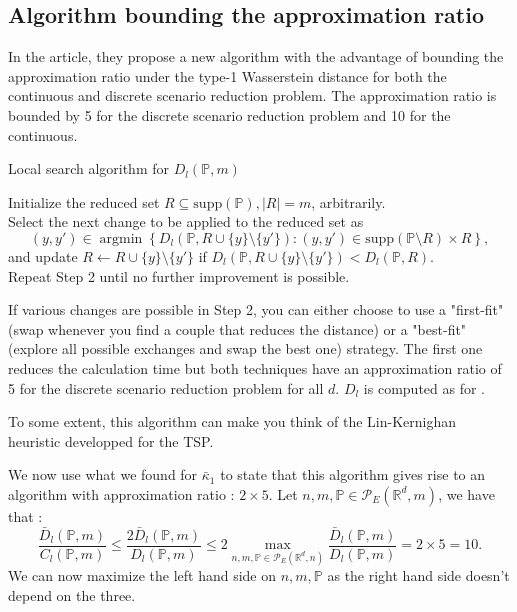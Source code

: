 \documentclass{amsart}
\newcommand{\argmin}{\mathop{\arg\min}}
\newcommand{\RR}{\mathbb{R}}
\begin{document}
\subsection{Algorithm bounding the approximation ratio}
In the article, they propose a new algorithm with the advantage of bounding the approximation ratio under the type-1 Wasserstein distance for both the continuous and discrete scenario reduction problem. The approximation ratio is bounded by 5 for the discrete scenario reduction problem and 10 for the continuous.
\begin{algorithm}
    \caption{Local search algorithm for $D_l\left(\mathbb{P},m\right)$}\label{Local search}
    Initialize the reduced set $R\subseteq \text{supp}\left(\mathbb{P}\right), \lvert R\rvert = m$, arbitrarily. \\ Select the next change to be applied to the reduced set as 
    $$
    \left(y,y'\right)\in\argmin\left\{D_l\left(\mathbb{P},R\cup\{y\}\setminus \{y'\}\right) : \left(y,y'\right)\in\text{supp}\left(\mathbb{P}\setminus R\right)\times R\right\},
    $$
    and update $R\gets R\cup \{y\}\setminus \{y'\}$ if $D_l\left(\mathbb{P}, R\cup\{y\}\setminus \{y'\} \right)<D_l\left(\mathbb{P},R\right).$ \\ Repeat Step 2 until no further improvement is possible.
\end{algorithm}
If various changes are possible in Step 2, you can either choose to use a "first-fit" (swap whenever you find a couple that reduces the distance) or a "best-fit" (explore all possible exchanges and swap the best one) strategy. The first one reduces the calculation time but both techniques have an approximation ratio of 5 for the discrete scenario reduction problem for all $d$. $D_l$ is computed as for .
\begin{remark}
    To some extent, this algorithm can make you think of the Lin-Kernighan heuristic developped for the TSP.
\end{remark}
We now use what we found for $\bar\kappa_1$ to state that this algorithm gives rise to an algorithm with approximation ratio : $2\times 5$. Let $n,m,\mathbb{P}\in\mathcal{P}_E\left(\RR^d,m\right)$, we have that : 
$$
\frac{\bar{D}_l\left(\mathbb{P},m\right)}{C_l\left(\mathbb{P},m\right)}\leq \frac{2\bar{D}_l\left(\mathbb{P},m\right)}{D_l\left(\mathbb{P},m\right)}\leq 2\max_{n,m,\mathbb{P}\in\mathcal{P}_E(\RR^d,n)}\frac{\bar{D}_l\left(\mathbb{P},m\right)}{D_l\left(\mathbb{P},m\right)}=2\times5=10.
$$
We can now maximize the left hand side on $n,m,\mathbb{P}$ as the right hand side doesn't depend on the three.
\end{document}
